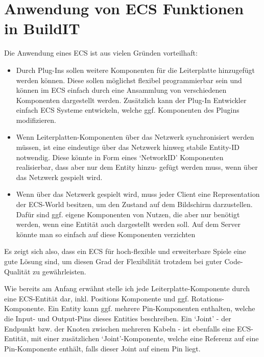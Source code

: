 \documentclass{article}
\begin{document}
    \section{Anwendung von ECS Funktionen in BuildIT}
    Die Anwendung eines ECS ist aus vielen Gründen vorteilhaft:
    \begin{itemize}
        \item Durch Plug-Ins sollen weitere Komponenten für die Leiterplatte hinzugefügt werden können. Diese sollen möglichst
              flexibel programmierbar sein und können im ECS einfach durch eine Ansammlung von verschiedenen Komponenten dargestellt werden.
              Zusätzlich kann der Plug-In Entwickler einfach ECS Systeme entwickeln, welche ggf. Komponenten des Plugins modifizieren.
        \item Wenn Leiterplatten-Komponenten über das Netzwerk synchronisiert werden müssen, ist eine eindeutige über das Netzwerk hinweg
              stabile Entity-ID notwendig. Diese könnte in Form eines `NetworkID' Komponenten realisierbar, dass aber nur dem Entity hinzu-
              gefügt werden muss, wenn über das Netzwerk gespielt wird.
        \item Wenn über das Netzwerk gespielt wird, muss jeder Client eine Representation der ECS-World besitzen, um den Zustand auf dem
              Bildschirm darzustellen. Dafür sind ggf. eigene Komponenten von Nutzen, die aber nur benötigt werden, wenn eine Entität
              auch dargestellt werden soll. Auf dem Server könnte man so einfach auf diese Komponenten verzichten
    \end{itemize}
    Es zeigt sich also, dass ein ECS für hoch-flexible und erweiterbare Spiele eine gute Lösung sind, um diesen Grad der Flexibilität trotzdem
    bei guter Code-Qualität zu gewährleisten.

    Wie bereits am Anfang erwähnt stelle ich jede Leiterplatte-Komponente durch eine ECS-Entität dar, inkl. Positions Komponente und ggf.
    Rotations-Komponente.
    Ein Entity kann ggf. mehrere Pin-Komponenten enthalten, welche die Input- und Output-Pins dieses Entities beschreiben.
    Ein `Joint' - der Endpunkt bzw. der Knoten zwischen mehreren Kabeln - ist ebenfalls eine ECS-Entität, mit einer zusätzlichen `Joint'-Komponente,
    welche eine Referenz auf eine Pin-Komponente enthält, falls dieser Joint auf einem Pin liegt.
\end{document}
